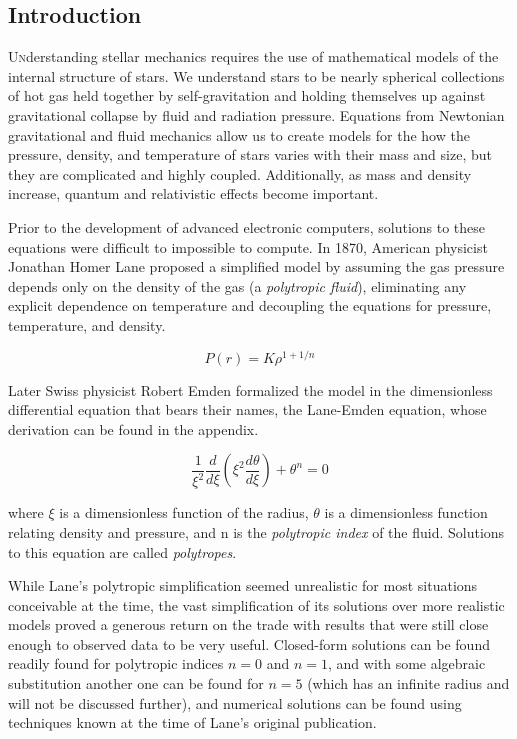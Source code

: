 \documentclass[twoside]{article}
\begin{document}
\begin{multicols}{2} %

\section{Introduction}

\lettrine[nindent=0em,lines=2]{U}nderstanding stellar mechanics requires the use
of mathematical models of the internal structure of stars. We understand stars
to be nearly spherical collections of hot gas held together by self-gravitation
and holding themselves up against gravitational collapse by fluid and radiation
pressure. Equations from Newtonian gravitational and fluid mechanics allow us to
create models for the how the pressure, density, and temperature of stars varies
with their mass and size, but they are complicated and highly
coupled.\cite{hansen2004} Additionally, as mass and density increase, quantum
and relativistic effects become important.

Prior to the development of advanced electronic computers, solutions to these
equations were difficult to impossible to compute. In 1870, American physicist
Jonathan Homer Lane proposed a simplified model\cite{lane1870} by assuming the
gas pressure depends only on the density of the gas (a \emph{polytropic fluid}),
eliminating any explicit dependence on temperature and decoupling the equations
for pressure, temperature, and density.

    \begin{equation}
        \label{eq:polystate}
        P(r) = K\rho^{1+1/n}
    \end{equation}
    
Later Swiss physicist Robert Emden formalized the model in the dimensionless
differential equation that bears their names, the Lane-Emden equation, whose
derivation can be found in the appendix.

    \begin{equation}
        \label{eq:le}
        \frac{1}{\xi^2}\frac{d}{d\xi}\left(\xi^2\frac{d\theta}{d\xi}\right)+\theta^n=0
    \end{equation}

where \(\xi\) is a dimensionless function of the radius, \(\theta\) is a
dimensionless function relating density and pressure, and n is the
\emph{polytropic index} of the fluid. Solutions to this equation are called
\emph{polytropes}.

While Lane's polytropic simplification seemed unrealistic for most situations
conceivable at the time, the vast simplification of its solutions over more
realistic models proved a generous return on the trade with results that were
still close enough to observed data to be very useful. Closed-form
solutions\cite{leblanc2010} can
be found readily found for polytropic indices \(n=0\) and \(n=1\), and with some
algebraic substitution another one can be found for \(n=5\) (which has an
infinite radius and will not be discussed further), and numerical solutions can
be found using techniques known at the time of Lane's original publication.


\end{multicols}
\end{document}

